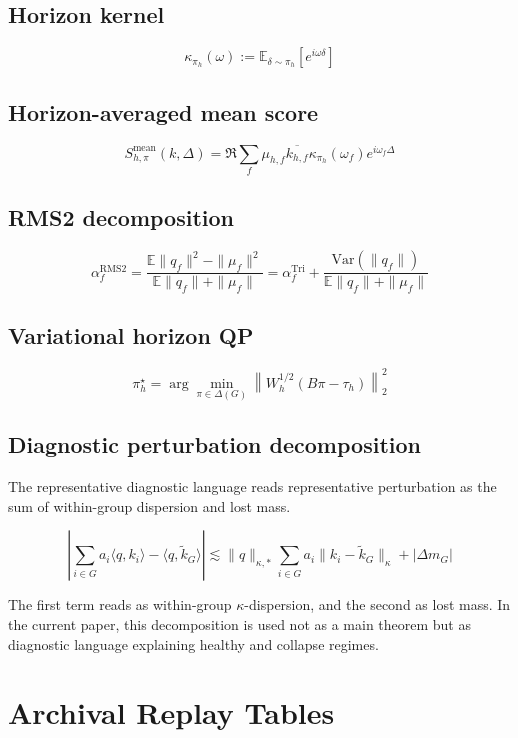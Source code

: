 \subsection{Horizon kernel}


$$
\kappa_{\pi_h}(\omega)
:=
\mathbb{E}_{\delta \sim \pi_h}
\left[e^{i\omega\delta}\right]
$$


\subsection{Horizon-averaged mean score}


$$
S^{\mathrm{mean}}_{h,\pi}(k, \Delta)
=
\Re
\sum_f
\mu_{h,f}
\overline{k_{h,f}}
\kappa_{\pi_h}(\omega_f)
e^{i\omega_f \Delta}
$$


\subsection{RMS2 decomposition}


$$
\alpha_f^{\mathrm{RMS2}}
=
\frac{\mathbb{E}\|q_f\|^2 - \|\mu_f\|^2}{\mathbb{E}\|q_f\| + \|\mu_f\|}
=
\alpha_f^{\mathrm{Tri}}
+
\frac{\mathrm{Var}(\|q_f\|)}{\mathbb{E}\|q_f\| + \|\mu_f\|}
$$


\subsection{Variational horizon QP}


$$
\pi_h^{\star}
=
\arg\min_{\pi \in \Delta(G)}
\left\|W_h^{1/2}(B\pi - \tau_h)\right\|_2^2
$$


\subsection{Diagnostic perturbation decomposition}


The representative diagnostic language reads representative perturbation as the sum of within-group dispersion and lost mass.


$$
\left|\sum_{i \in G} a_i \langle q, k_i \rangle - \langle q, \tilde{k}_G \rangle\right|
\lesssim
\|q\|_{\kappa,*} \sum_{i \in G} a_i \|k_i - \tilde{k}_G\|_{\kappa}
+
|\Delta m_G|
$$


The first term reads as within-group $\kappa$-dispersion, and the second as lost mass. In the current paper, this decomposition is used not as a main theorem but as diagnostic language explaining healthy and collapse regimes.


\section{Archival Replay Tables}


